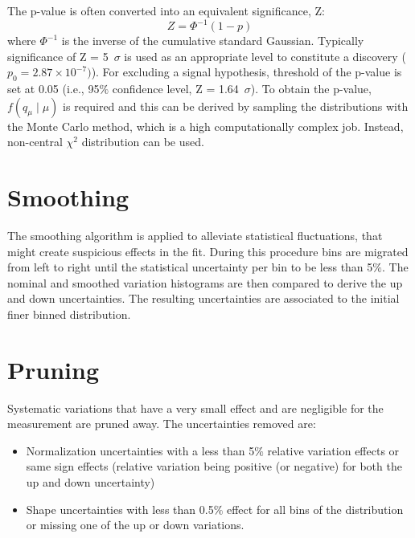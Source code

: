 The p-value is often converted into an equivalent significance, Z:
\begin{equation}
Z=\Phi^{-1}(1-p)
\end{equation}
where $\Phi^{-1}$ is the inverse of the cumulative standard Gaussian.
Typically significance of Z = 5~$\sigma$ is used as an appropriate level to constitute a discovery ($p_0 = 2.87 \times 10^{-7})$). For excluding a signal hypothesis, threshold of the p-value is set at 0.05 (i.e., 95$\%$ confidence level, Z = 1.64~$\sigma$).
To obtain the p-value, $f\left(q_{\mu} \mid \mu \right)$ is required and this can be derived by sampling the distributions with the Monte Carlo method, which is a high computationally complex job. Instead, non-central $\chi^2$ distribution can be used.

\section{Smoothing}
The smoothing algorithm is applied to alleviate statistical fluctuations, that might create suspicious effects in the fit.
During this procedure bins are migrated from left to right until the statistical uncertainty per bin to be less than 5$\%$. The nominal and smoothed variation histograms are then compared to derive the up and down uncertainties. The resulting uncertainties are associated to the initial finer binned distribution. 

\section{Pruning}
Systematic variations that have a very small effect and are negligible for the measurement are pruned away. The uncertainties removed are:
  \begin{itemize}
   \item  Normalization uncertainties with a less than 5$\%$ relative variation effects or same sign effects (relative variation being positive (or negative) for both the up and down uncertainty)
   \item  Shape uncertainties with less than 0.5$\%$ effect for all bins of the distribution or missing one of the up or down variations.
    \end{itemize}
    
